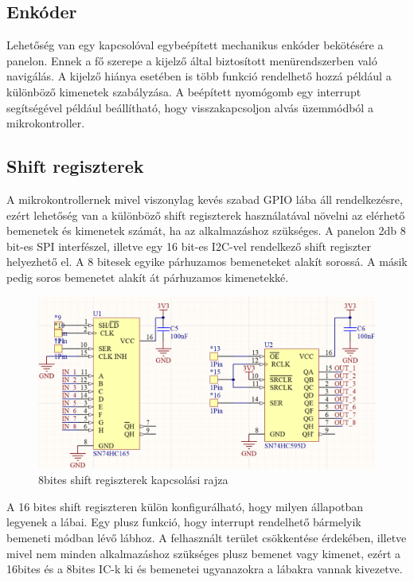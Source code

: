 \subsection{Enkóder}
Lehetőség van egy kapcsolóval egybeépített mechanikus enkóder bekötésére a panelon. Ennek a fő szerepe a kijelző által biztosított menürendszerben való navigálás. A kijelző hiánya esetében is több funkció rendelhető hozzá például a különböző kimenetek szabályzása. A beépített nyomógomb egy interrupt segítségével például beállítható, hogy visszakapcsoljon alvás üzemmódból a mikrokontroller.


\subsection{Shift regiszterek}
A mikrokontrollernek mivel viszonylag kevés szabad GPIO lába áll rendelkezésre, ezért lehetőség van a különböző shift regiszterek használatával növelni az elérhető bemenetek és kimenetek számát, ha az alkalmazáshoz szükséges. A panelon 2db 8 bit-es SPI interfészel, illetve egy 16 bit-es I2C-vel rendelkező shift regiszter helyezhető el. A 8 bitesek egyike párhuzamos bemeneteket alakít sorossá. A másik pedig soros bemenetet alakít át párhuzamos kimenetekké. 
\begin{figure}[!ht]
    \centering
    \includegraphics[width=140mm, keepaspectratio]{figures/8bit_shift_registers.png}
    \caption{8bites shift regiszterek kapcsolási rajza}
    \label{fig:shift_register}
\end{figure}
A 16 bites shift regiszteren külön konfigurálható, hogy milyen állapotban legyenek a lábai. Egy plusz funkció, hogy interrupt rendelhető bármelyik bemeneti módban lévő lábhoz. A felhasznált terület csökkentése érdekében, illetve mivel nem minden alkalmazáshoz szükséges plusz bemenet vagy kimenet, ezért a 16bites és a 8bites IC-k ki és bemenetei ugyanazokra a lábakra vannak kivezetve.

